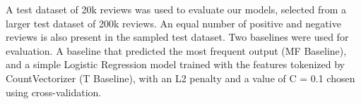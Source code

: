 \documentclass{svproc}
\begin{document}
A test dataset of 20k reviews was used to evaluate our models, selected from a larger test dataset of 200k reviews. An equal number of positive and negative reviews is also present in the sampled test dataset. Two baselines were used for evaluation. A baseline that predicted the most frequent output (MF Baseline), and a simple Logistic Regression model trained with the features tokenized by CountVectorizer (T Baseline), with an L2 penalty and a value of C = 0.1 chosen using cross-validation.

\begin{table}[hbt!]
    \caption{Comparison of multiple metrics across models}
\end{table}
\end{document}
